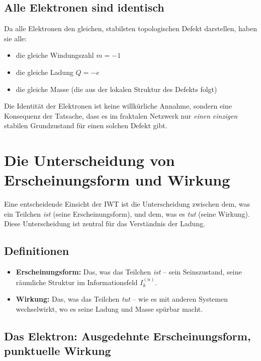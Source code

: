 \subsection{Alle Elektronen sind identisch}
\label{sub:phasenquantisierung_identisch}

Da alle Elektronen den gleichen, stabilsten topologischen Defekt darstellen, haben sie alle:

\begin{itemize}
    \item die gleiche Windungszahl \( m = -1 \)
    \item die gleiche Ladung \( Q = -e \)
    \item die gleiche Masse (die aus der lokalen Struktur des Defekts folgt)
\end{itemize}

Die Identität der Elektronen ist keine willkürliche Annahme, sondern eine Konsequenz der Tatsache, dass es im fraktalen Netzwerk nur \emph{einen einzigen} stabilen Grundzustand für einen solchen Defekt gibt.

\section{Die Unterscheidung von Erscheinungsform und Wirkung}
\label{app:phasenquantisierung_erscheinungsform_wirkung}

Eine entscheidende Einsicht der IWT ist die Unterscheidung zwischen dem, was ein Teilchen \emph{ist} (seine Erscheinungsform), und dem, was es \emph{tut} (seine Wirkung). Diese Unterscheidung ist zentral für das Verständnis der Ladung.

\subsection{Definitionen}

\begin{itemize}
    \item \textbf{Erscheinungsform:} Das, was das Teilchen \emph{ist} – sein Seinszustand, seine räumliche Struktur im Informationsfeld \( I_k^{(n)} \).
    \item \textbf{Wirkung:} Das, was das Teilchen \emph{tut} – wie es mit anderen Systemen wechselwirkt, wo es seine Ladung und Masse spürbar macht.
\end{itemize}

\subsection{Das Elektron: Ausgedehnte Erscheinungsform, punktuelle Wirkung}

